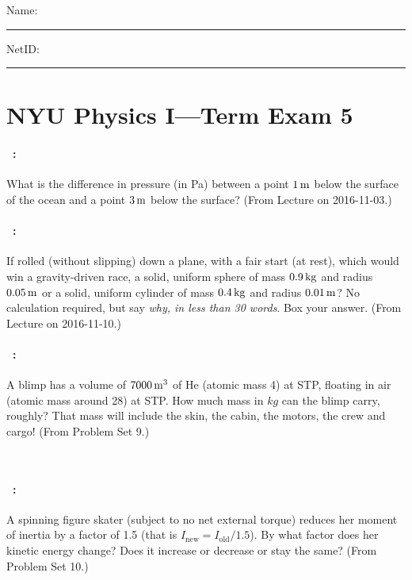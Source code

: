 \documentclass[12pt]{article} 
\begin{document}
\noindent
Name: \rule[-1ex]{0.55\textwidth}{0.1pt}
NetID: \rule[-1ex]{0.2\textwidth}{0.1pt}

\section*{NYU Physics I---Term Exam 5}

\paragraph{\problemname~\theproblem:}%
What is the difference in pressure (in Pa) between a point $1\,\mathrm{m}$
below the surface of the ocean and a point $3\,\mathrm{m}$ below the surface?
(From Lecture on 2016-11-03.)

\vfill

\paragraph{\problemname~\theproblem:}%
If rolled (without slipping) down a plane, with a fair start (at
rest), which would win a gravity-driven race, a solid, uniform sphere
of mass $0.9\,\mathrm{kg}$ and radius $0.05\,\mathrm{m}$ or a solid, uniform cylinder
of mass $0.4\,\mathrm{kg}$ and radius $0.01\,\mathrm{m}$? No calculation required, but
say \emph{why, in less than 30 words}. Box your answer. (From Lecture
on 2016-11-10.)

\vfill

\paragraph{\problemname~\theproblem:}%
A blimp has a volume of $7000\,\mathrm{m}^3$ of He (atomic mass 4) at STP,
floating in air (atomic mass around 28) at STP. How much mass in $kg$
can the blimp carry, roughly? That mass will include the skin, the
cabin, the motors, the crew and cargo! (From Problem Set 9.)

\vfill
~
\clearpage

\paragraph{\problemname~\theproblem:}%
A spinning figure skater (subject to no net external torque)
reduces her moment of inertia by a factor
of 1.5 (that is $I_{\mathrm{new}} = I_{\mathrm{old}} / 1.5$). By
what factor does her kinetic energy change? Does it increase or
decrease or stay the same?
(From Problem Set 10.)
\end{document}
